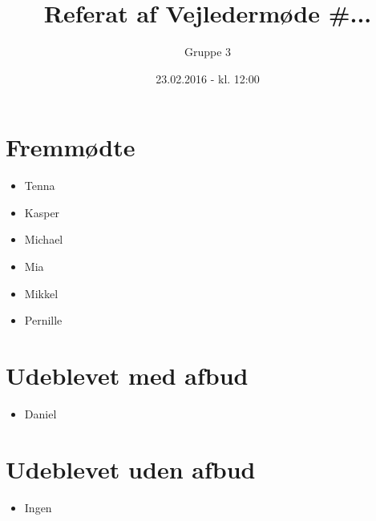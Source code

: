 \documentclass{article}
\title{Referat af Vejledermøde \#...}
\author{Gruppe 3}
\date{23.02.2016 - kl. 12:00}
\begin{document}
	\maketitle
	
	\section{Fremmødte}
	\begin{itemize}
		\item Tenna
		\item Kasper 
		\item Michael 
		\item Mia 
		\item Mikkel 
		\item Pernille 
	\end{itemize}
	
	\section{Udeblevet med afbud}
	\begin{itemize}
		\item Daniel
	\end{itemize}
	
	\section{Udeblevet uden afbud}
	\begin{itemize}
		\item Ingen
	\end{itemize}
	
\end{document}
